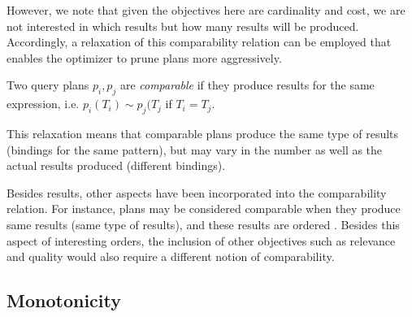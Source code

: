 However, we note that given the objectives here are cardinality and cost, we are not interested in which results but how many results will be produced. 
Accordingly, a relaxation of this comparability relation can be employed that enables the optimizer to prune plans
more aggressively.

\begin{definition}
  \label{def:comparability}
  Two query plans $p_i, p_j$ are \emph{comparable} if they produce results for the same expression, i.e. $p_i(T_i) \sim  p_j(T_j$ if $T_i = T_j$. 
\end{definition}

This relaxation means that comparable plans produce the same type of results (bindings for the same pattern), but may vary in the number as well as the actual results produced (different bindings). 

Besides results, other aspects have been incorporated into the comparability relation. For instance, plans may be considered comparable when they produce same results (same type of results), and these results are ordered . 
Besides this aspect of interesting orders, the inclusion of other objectives such as relevance and quality would also require a different notion of comparability.  

\subsection{Monotonicity}
\label{sec:sharing}

